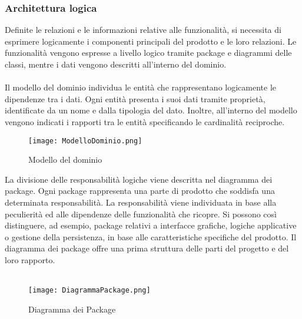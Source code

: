 \clearpage




\subsubsection{Architettura logica}


Definite le relazioni e le informazioni relative alle funzionalità, 
si necessita di esprimere logicamente i componenti principali del prodotto e le loro relazioni.
Le funzionalità vengono espresse a livello logico tramite package e diagrammi delle classi, 
mentre i dati vengono descritti all'interno del dominio. \\
\\
Il modello del dominio individua le entità che rappresentano logicamente le dipendenze tra i dati.
Ogni entità presenta i suoi dati tramite proprietà, identificate da un nome e dalla tipologia del dato.
Inoltre, all'interno del modello vengono indicati i rapporti tra le entità specificando le cardinalità reciproche.\\

\begin{figure}[h!]
    \begin{center}
        \texttt{[image: ModelloDominio.png]}
        \caption{Modello del dominio}
    \end{center}
\end{figure}
\clearpage


La divisione delle responsabilità logiche viene descritta nel diagramma dei package.
Ogni package rappresenta una parte di prodotto che soddisfa una determinata responsabilità. 
La responsabilità viene individuata in base alla peculierità ed alle dipendenze delle funzionalità che ricopre.
Si possono così distinguere, ad esempio, package relativi a interfacce grafiche, logiche applicative o gestione della persistenza, 
in base alle caratteristiche specifiche del prodotto.
Il diagramma dei package offre una prima struttura delle parti del progetto e del loro rapporto.\\
\\

\begin{figure}[h!]
    \begin{center}
        \texttt{[image: DiagrammaPackage.png]}
        \caption{Diagramma dei Package}
    \end{center}
\end{figure}
\clearpage

